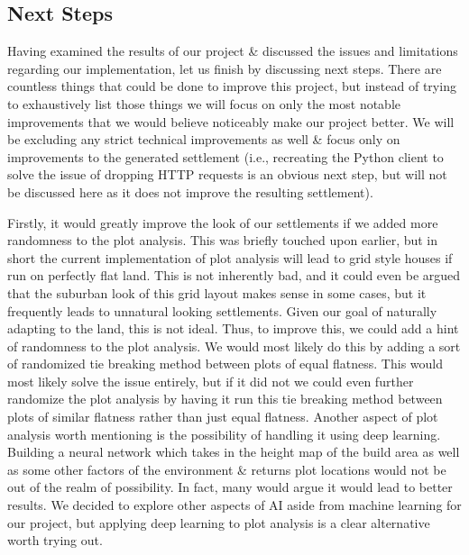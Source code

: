 \documentclass[11pt, oneside]{article}
\begin{document}
\begin{normalsize}
\subsection{Next Steps}

Having examined the results of our project \& discussed the issues and limitations regarding our implementation, let us finish by discussing next steps. 
There are countless things that could be done to improve this project, but instead of trying to exhaustively list those things we will focus on only the most notable improvements that we would believe noticeably make our project better. 
We will be excluding any strict technical improvements as well \& focus only on improvements to the generated settlement (i.e., recreating the Python client to solve the issue of dropping HTTP requests is an obvious next step, but will not be discussed here as it does not improve the resulting settlement).

Firstly, it would greatly improve the look of our settlements if we added more randomness to the plot analysis. 
This was briefly touched upon earlier, but in short the current implementation of plot analysis will lead to grid style houses if run on perfectly flat land. 
This is not inherently bad, and it could even be argued that the suburban look of this grid layout makes sense in some cases, but it frequently leads to unnatural looking settlements. 
Given our goal of naturally adapting to the land, this is not ideal. 
Thus, to improve this, we could add a hint of randomness to the plot analysis. 
We would most likely do this by adding a sort of randomized tie breaking method between plots of equal flatness. 
This would most likely solve the issue entirely, but if it did not we could even further randomize the plot analysis by having it run this tie breaking method between plots of similar flatness rather than just equal flatness. 
Another aspect of plot analysis worth mentioning is the possibility of handling it using deep learning. 
Building a neural network which takes in the height map of the build area as well as some other factors of the environment \& returns plot locations would not be out of the realm of possibility. 
In fact, many would argue it would lead to better results. 
We decided to explore other aspects of AI aside from machine learning for our project, but applying deep learning to plot analysis is a clear alternative worth trying out. 


\end{normalsize}
\end{document}
